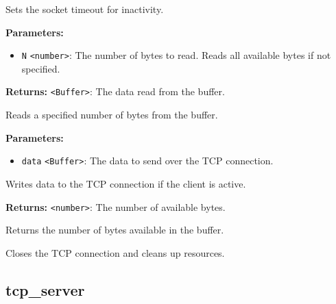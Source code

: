 \documentclass[12pt,a4paper]{article}
\begin{document}
\noindent Sets the socket timeout for inactivity.

\vspace{5mm}
\noindent {}


\noindent \textbf{Parameters:}
\begin{itemize}
  \item \texttt{N} \texttt{<number>}: The number of bytes to read. Reads all available bytes if not specified.
\end{itemize}

\noindent \textbf{Returns:} \texttt{<Buffer>}: The data read from the buffer.

\noindent Reads a specified number of bytes from the buffer.

\vspace{5mm}
\noindent {}


\noindent \textbf{Parameters:}
\begin{itemize}
  \item \texttt{data} \texttt{<Buffer>}: The data to send over the TCP connection.
\end{itemize}

\noindent Writes data to the TCP connection if the client is active.

\vspace{5mm}
\noindent {}


\noindent \textbf{Returns:} \texttt{<number>}: The number of available bytes.

\noindent Returns the number of bytes available in the buffer.

\vspace{5mm}
\noindent {}


\noindent Closes the TCP connection and cleans up resources.


\subsection{tcp\_server}
\vspace{5mm}
\noindent {}
\end{document}
